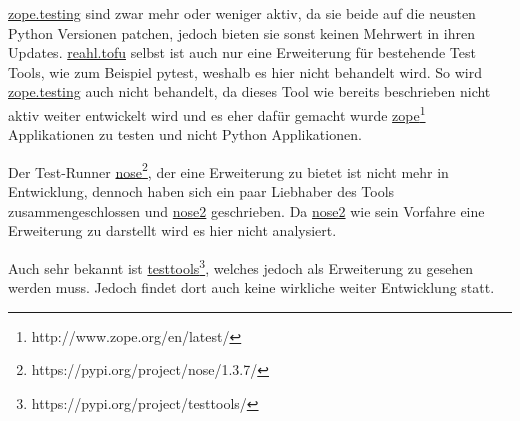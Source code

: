 \href{https://pypi.org/project/zope.testing/}{zope.testing} sind zwar mehr oder weniger aktiv, da sie
beide auf die neusten Python Versionen patchen, jedoch bieten sie sonst keinen Mehrwert in ihren Updates.
\href{https://www.reahl.org/docs/4.0/devtools/tofu.d.html}{reahl.tofu} selbst ist
auch nur eine Erweiterung für bestehende Test Tools, wie zum Beispiel pytest, weshalb es hier nicht behandelt wird. So wird
\href{https://pypi.org/project/zope.testing/}{zope.testing} auch nicht behandelt, da dieses Tool
wie bereits beschrieben nicht aktiv weiter entwickelt wird und es eher dafür gemacht wurde \href{http://www.zope.org/en/latest/}{zope}\footnote{http://www.zope.org/en/latest/}
Applikationen zu testen und nicht Python Applikationen.

Der Test-Runner \href{https://pypi.org/project/nose/1.3.7/}{nose}\footnote{https://pypi.org/project/nose/1.3.7/}, der eine Erweiterung
zu  bietet ist nicht mehr in Entwicklung, dennoch haben sich ein paar Liebhaber des Tools zusammengeschlossen
und \href{https://pypi.org/project/nose2/}{nose2} geschrieben.
Da \href{https://pypi.org/project/nose2/}{nose2} wie sein Vorfahre eine Erweiterung zu 
darstellt wird es hier nicht analysiert.

Auch sehr bekannt ist \href{https://pypi.org/project/testtools/}{testtools}\footnote{https://pypi.org/project/testtools/}, welches jedoch als
Erweiterung zu  gesehen werden muss. Jedoch findet dort auch keine wirkliche weiter Entwicklung statt.

